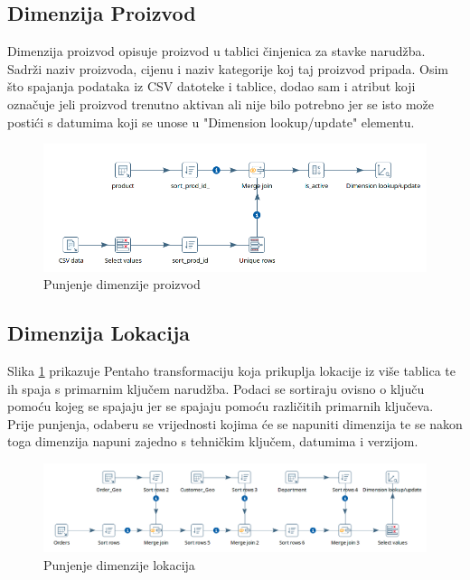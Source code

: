 \documentclass[12pt, oneside]{book}
\begin{document}
\vspace{3cm}

\subsection{Dimenzija Proizvod}
Dimenzija proizvod opisuje proizvod u tablici činjenica za stavke narudžba. Sadrži naziv proizvoda, cijenu i naziv kategorije koj taj proizvod pripada. Osim što spajanja podataka iz CSV datoteke i tablice, dodao sam i atribut koji označuje jeli proizvod trenutno aktivan ali nije bilo potrebno jer se isto može postići s datumima koji se unose u "Dimension lookup/update" elementu. 

\begin{figure}[H]
\includegraphics[width=16cm]{images/i03_Pentaho-Dim-Product.png}
\centering
\caption{Punjenje dimenzije proizvod}
\end{figure}
\subsection{Dimenzija Lokacija}
Slika \ref{DimLoc} prikazuje Pentaho transformaciju koja prikuplja lokacije iz više tablica te ih spaja s primarnim ključem narudžba. Podaci se sortiraju ovisno o ključu pomoću kojeg se spajaju jer se spajaju pomoću različitih primarnih ključeva. Prije punjenja, odaberu se vrijednosti kojima će se napuniti dimenzija te se nakon toga dimenzija napuni zajedno s tehničkim ključem, datumima i verzijom.
 
\begin{figure}[H]
\label{DimLoc}
\includegraphics[width=16cm]{images/i02_Pentaho-Dim-Location.png}
\centering
\caption{Punjenje dimenzije lokacija}
\end{figure}
\end{document}
